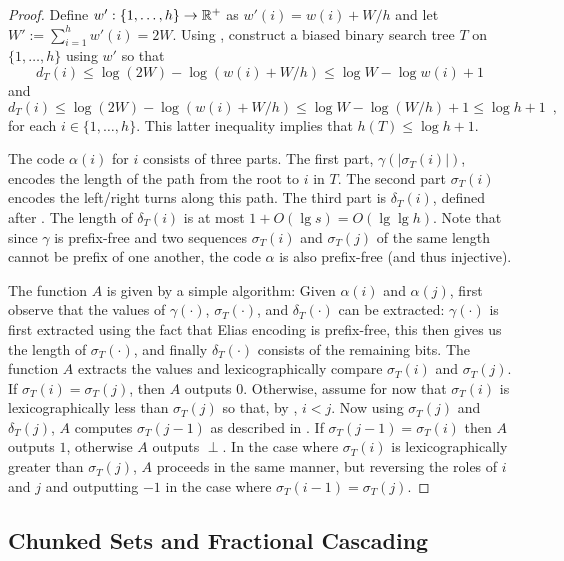 \documentclass[kpfonts]{patmorin}
\let\le\leqslant
\begin{document}
\begin{proof}
  Define $w':\{1,\ldots,h\}\to \mathbb{R}^+$ as $w'(i)=w(i)+W/h$ and let $W':=\sum_{i=1}^h w'(i)=2W$.
  Using , construct a biased binary search tree $T$ on $\{1,\ldots,h\}$ using $w'$ so that 
  \[   
    d_T(i)\le\log (2W)-\log(w(i)+W/h) \le \log W-\log w(i)+1
  \]
  and
  \[
  d_T(i)\le\log (2W)-\log(w(i)+W/h) \le \log W-\log (W/h)+1 \le \log h + 1\enspace ,
  \]
  for each $i\in\{1,\ldots,h\}$.  This latter inequality implies that $h(T)\le\log h + 1$.

  The code $\alpha(i)$ for $i$ consists of three parts.  The first part, $\gamma(|\sigma_T(i)|)$, encodes the length of the path from the root to $i$ in $T$. The second part $\sigma_T(i)$ encodes the left/right turns along this path. The third part is $\delta_T(i)$, defined after . The length of $\delta_T(i)$ is at most $1+O(\lg s)=O(\lg\lg h)$. Note that since $\gamma$ is prefix-free and two sequences $\sigma_T(i)$ and $\sigma_T(j)$ of the same length cannot be prefix of one another, the code $\alpha$ is also prefix-free (and thus injective).

  The function $A$ is given by a simple algorithm: Given $\alpha(i)$ and $\alpha(j)$, first observe that the values of $\gamma(\cdot)$, $\sigma_T(\cdot)$, and $\delta_T(\cdot)$ can be extracted: $\gamma(\cdot)$ is first extracted using the fact that Elias encoding is prefix-free, this then gives us the length of $\sigma_T(\cdot)$, and finally $\delta_T(\cdot)$ consists of the remaining bits. 
   The function $A$ extracts the values and lexicographically compare $\sigma_T(i)$ and $\sigma_T(j)$.  If $\sigma_T(i)=\sigma_T(j)$, then $A$ outputs $0$. 
   Otherwise, assume for now that $\sigma_T(i)$ is lexicographically less than $\sigma_T(j)$ so that, by , $i < j$.  Now using $\sigma_T(j)$ and $\delta_T(j)$, $A$ computes $\sigma_T(j-1)$ as described in .  
   If $\sigma_T(j-1)=\sigma_T(i)$ then $A$ outputs $1$, otherwise $A$ outputs $\perp$.
  In the case where $\sigma_T(i)$ is lexicographically greater than $\sigma_T(j)$, $A$ proceeds in the same manner, but reversing the roles of $i$ and $j$ and outputting $-1$ in the case where $\sigma_T(i-1)=\sigma_T(j)$.
\end{proof}

\subsection{Chunked Sets and Fractional Cascading}
\end{document}
